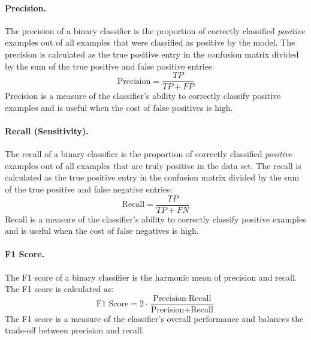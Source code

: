\documentclass{article}[11pt]
\begin{document}
\paragraph*{Precision.}
The precision of a binary classifier is the proportion of correctly classified \textit{positive} examples out of all examples that were classified as positive by the model.
The precision is calculated as the true positive entry in the confusion matrix divided by the sum of the true positive and false positive entries:
\begin{equation*}
    \text{Precision} = \frac{TP}{TP + FP}
\end{equation*}
Precision is a measure of the classifier's ability to correctly classify positive examples and is useful when the cost of false positives is high.

\paragraph*{Recall (Sensitivity).}
The recall of a binary classifier is the proportion of correctly classified \textit{positive} examples out of all examples that are truly positive in the data set.
The recall is calculated as the true positive entry in the confusion matrix divided by the sum of the true positive and false negative entries:
\begin{equation*}
    \text{Recall} = \frac{TP}{TP + FN}
\end{equation*}
Recall is a measure of the classifier's ability to correctly classify positive examples and is useful when the cost of false negatives is high.

\paragraph*{F1 Score.}
The F1 score of a binary classifier is the harmonic mean of precision and recall. The F1 score is calculated as:
\begin{equation*}
    \text{F1 Score} = 2\cdot\frac{\text{Precision}\cdot\text{Recall}}{\text{Precision} + \text{Recall}}
\end{equation*}
The F1 score is a measure of the classifier's overall performance and balances the trade-off between precision and recall.
\end{document}
